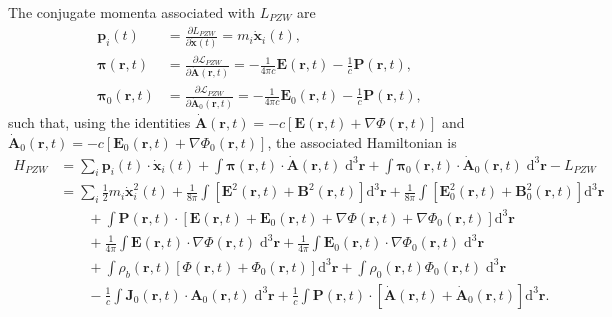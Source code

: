 The conjugate momenta associated with $L_{PZW}$ are
\begin{equation}
\begin{split}
\mathbf{p}_i(t) &= \frac{\partial L_{PZW}}{\partial \dot{\mathbf{x}}(t)} = m_i\dot{\mathbf{x}}_i(t),\\
\bm{\pi}(\mathbf{r},t) &= \frac{\partial \mathcal{L}_{PZW}}{\partial \dot{\mathbf{A}}(\mathbf{r},t)} = -\frac{1}{4\pi c}\mathbf{E}(\mathbf{r},t) - \frac{1}{c}\mathbf{P}(\mathbf{r},t),\\
\bm{\pi}_0(\mathbf{r},t) &= \frac{\partial \mathcal{L}_{PZW}}{\partial \dot{\mathbf{A}}_0(\mathbf{r},t)} = -\frac{1}{4\pi c}\mathbf{E}_0(\mathbf{r},t) - \frac{1}{c}\mathbf{P}(\mathbf{r},t),
\end{split}
\end{equation}
such that, using the identities $\dot{\mathbf{A}}(\mathbf{r},t) = -c[\mathbf{E}(\mathbf{r},t) + \nabla\Phi(\mathbf{r},t)]$ and $\dot{\mathbf{A}}_0(\mathbf{r},t) = -c[\mathbf{E}_0(\mathbf{r},t) + \nabla\Phi_0(\mathbf{r},t)]$, the associated Hamiltonian is
\begin{equation}
\begin{split}
H_{PZW} &= \sum_i\mathbf{p}_i(t)\cdot\dot{\mathbf{x}}_i(t) + \int\bm{\pi}(\mathbf{r},t)\cdot\dot{\mathbf{A}}(\mathbf{r},t)\;\mathrm{d}^3\mathbf{r} + \int\bm{\pi}_0(\mathbf{r},t)\cdot\dot{\mathbf{A}}_0(\mathbf{r},t)\;\mathrm{d}^3\mathbf{r} - L_{PZW}\\
&= \sum_i\frac{1}{2}m_i\dot{\mathbf{x}}_i^2(t) + \frac{1}{8\pi}\int\left[\mathbf{E}^2(\mathbf{r},t) + \mathbf{B}^2(\mathbf{r},t)\right]\mathrm{d}^3\mathbf{r} + \frac{1}{8\pi}\int\left[\mathbf{E}_0^2(\mathbf{r},t) + \mathbf{B}_0^2(\mathbf{r},t)\right]\mathrm{d}^3\mathbf{r}\\
&\qquad+\int\mathbf{P}(\mathbf{r},t)\cdot\left[\mathbf{E}(\mathbf{r},t) + \mathbf{E}_0(\mathbf{r},t) + \nabla\Phi(\mathbf{r},t) + \nabla\Phi_0(\mathbf{r},t)\right]\mathrm{d}^3\mathbf{r}\\
&\qquad+ \frac{1}{4\pi}\int\mathbf{E}(\mathbf{r},t)\cdot\nabla\Phi(\mathbf{r},t)\;\mathrm{d}^3\mathbf{r} + \frac{1}{4\pi}\int\mathbf{E}_0(\mathbf{r},t)\cdot\nabla\Phi_0(\mathbf{r},t)\;\mathrm{d}^3\mathbf{r}\\
&\qquad+ \int\rho_b(\mathbf{r},t)\left[\Phi(\mathbf{r},t) + \Phi_0(\mathbf{r},t)\right]\mathrm{d}^3\mathbf{r} + \int\rho_0(\mathbf{r},t)\Phi_0(\mathbf{r},t)\;\mathrm{d}^3\mathbf{r}\\
&\qquad - \frac{1}{c}\int\mathbf{J}_0(\mathbf{r},t)\cdot\mathbf{A}_0(\mathbf{r},t)\;\mathrm{d}^3\mathbf{r} + \frac{1}{c}\int\mathbf{P}(\mathbf{r},t)\cdot\left[\dot{\mathbf{A}}(\mathbf{r},t) + \dot{\mathbf{A}}_0(\mathbf{r},t)\right]\mathrm{d}^3\mathbf{r}.
\end{split}
\end{equation}
